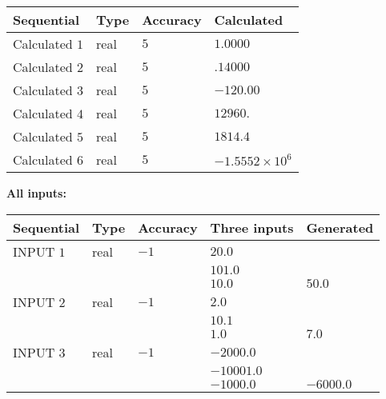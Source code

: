 \documentclass[12pt]{article}
\begin{document}
   
   
   
\noindent{}
   
   
  
  
\noindent\begin{tabular}{|l|l|l|l|}
\hline
 Sequential & Type & Accuracy & Calculated \\ 
\hline
 
 
  Calculated $           1$ & real & $           5 $ & 
 $ 1.0000 $ 
 \\  \hline  
 
 
  Calculated $           2$ & real & $           5 $ & 
 $ .14000 $ 
 \\  \hline  
 
 
  Calculated $           3$ & real & $           5 $ & 
 $ -120.00 $ 
 \\  \hline  
 
 
  Calculated $           4$ & real & $           5 $ & 
 $ 12960. $ 
 \\  \hline  
 
 
  Calculated $           5$ & real & $           5 $ & 
 $ 1814.4 $ 
 \\  \hline  
 
 
  Calculated $           6$ & real & $           5 $ & 
 $ -1.5552 \times 10^{6} $ 
 \\  \hline  
 \end{tabular}
   
   
   
   
\noindent\vspace{0.1in}\hspace{-0.08in} {\textbf{\Large{All inputs: }}}
   
   
  
  
\noindent\begin{tabular}{|l|l|l|l|l|}
\hline
 Sequential & Type & Accuracy & Three inputs & Generated \\ 
\hline
 
 
  INPUT $           1$ & real & $          -1 $ & $
 20.0
  $ & \\
  & & &  $
 101.0
  $ & \\
  & & &  $
 10.0
 $ & $ 50.0 $ 
 \\  \hline  
 
 
  INPUT $           2$ & real & $          -1 $ & $
 2.0
  $ & \\
  & & &  $
 10.1
  $ & \\
  & & &  $
 1.0
 $ & $ 7.0 $ 
 \\  \hline  
 
 
  INPUT $           3$ & real & $          -1 $ & $
 -2000.0
  $ & \\
  & & &  $
 -10001.0
  $ & \\
  & & &  $
 -1000.0
 $ & $ -6000.0 $ 
 \\  \hline  
 \end{tabular}
   
\end{document}
